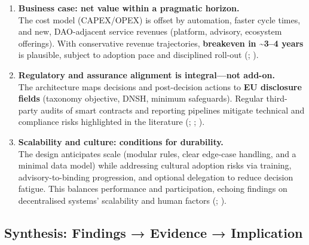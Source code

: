 \documentclass[
  english,
  12pt,
  oneside,
  open=any]{scrbook}
\begin{document}
\begin{enumerate}
{  rights to propose, vote, and review outcomes} shift stakeholders from
  passive observers to active contributors. This supports a move from
  perceived opacity to shared ownership, with legitimacy stemming from
  process visibility and auditability
  (;
  ).
\item
  \textbf{Business case: net value within a pragmatic horizon.}\\
  The cost model (CAPEX/OPEX) is offset by automation, faster cycle
  times, and new, DAO-adjacent service revenues (platform, advisory,
  ecosystem offerings). With conservative revenue trajectories,
  \textbf{breakeven in \textasciitilde3--4 years} is plausible, subject
  to adoption pace and disciplined roll-out
  (;
  ).
\item
  \textbf{Regulatory and assurance alignment is integral---not
  add-on.}\\
  The architecture maps decisions and post-decision actions to
  \textbf{EU disclosure fields} (taxonomy objective, DNSH, minimum
  safeguards). Regular third-party audits of smart contracts and
  reporting pipelines mitigate technical and compliance risks
  highlighted in the literature
  (;
  ; ).
\item
  \textbf{Scalability and culture: conditions for durability.}\\
  The design anticipates scale (modular rules, clear edge-case handling,
  and a minimal data model) while addressing cultural adoption risks via
  training, advisory-to-binding progression, and optional delegation to
  reduce decision fatigue. This balances performance and participation,
  echoing findings on decentralised systems' scalability and human
  factors
  (; ).
\end{enumerate}

\subsection{Synthesis: Findings → Evidence →
Implication}\label{synthesis-findings-evidence-implication}
\end{document}
